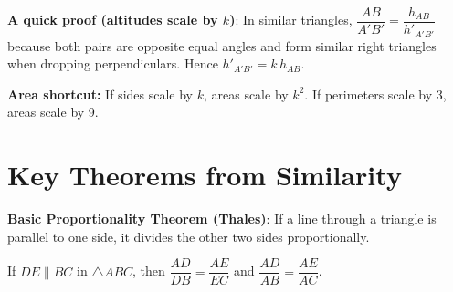 \documentclass[11pt,a4paper]{article}
\begin{document}
\begin{examplebox}
\textbf{A quick proof (altitudes scale by $k$)}: In similar triangles, $\dfrac{AB}{A'B'} = \dfrac{h_{AB}}{h'_{A'B'}}$ because both pairs are opposite equal angles and form similar right triangles when dropping perpendiculars. Hence $h'_{A'B'} = k\,h_{AB}$.
\end{examplebox}

\begin{center}
\end{center}

\begin{shortcutbox}
\textbf{Area shortcut:} If sides scale by $k$, areas scale by $k^2$. If perimeters scale by $3$, areas scale by $9$.
\end{shortcutbox}

\newpage

\section*{Key Theorems from Similarity}

\begin{theorembox}
\textbf{Basic Proportionality Theorem (Thales)}: If a line through a triangle is parallel to one side, it divides the other two sides proportionally.

If $DE \parallel BC$ in $\triangle ABC$, then $\dfrac{AD}{DB} = \dfrac{AE}{EC}$ and $\dfrac{AD}{AB} = \dfrac{AE}{AC}$.
\end{theorembox}
\end{document}
